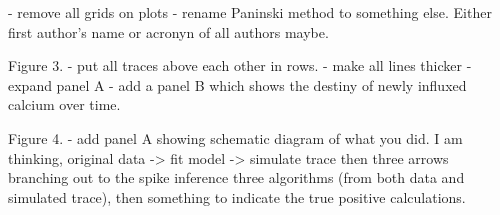 - remove all grids on plots
- rename Paninski method to something else. Either first author's name or acronyn of all authors maybe.

Figure 3.
- put all traces above each other in rows.
- make all lines thicker
- expand panel A
- add a panel B which shows the destiny of newly influxed calcium over time.

Figure 4.
- add panel A showing schematic diagram of what you did. I am thinking, original data -> fit model -> simulate trace then three arrows branching out to the spike inference three algorithms (from both data and simulated trace), then something to indicate the true positive calculations.

